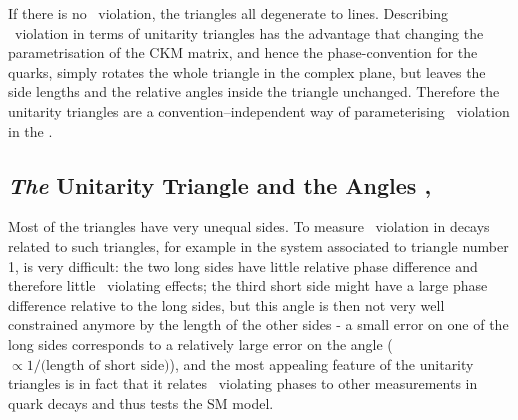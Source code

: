 If there is no \cp\ violation, the triangles all degenerate to
 lines. Describing \cp\ violation in terms of unitarity triangles has
 the advantage that changing the parametrisation of the CKM matrix,
 and hence the phase-convention for the quarks, simply rotates the
 whole triangle in the complex plane, but leaves the side lengths and
 the relative angles inside the triangle unchanged. Therefore the
 unitarity triangles are a convention--independent way of parameterising
 \cp\ violation in the \sm.


\subsection{\emph{The} Unitarity Triangle and the Angles \gam, \bet}
\label{sec:th.b.thetriangle}
 Most of the triangles have very unequal sides. To measure \cp\
 violation in decays related to such triangles, for example in the
 \prt{K^0} system associated to triangle number 1, is very difficult:
 the two long sides have little relative phase difference and
 therefore little \cp\ violating effects; the third short side might have a
 large phase difference relative to the long sides, but this angle is
 then not very well constrained anymore by the length of the other
 sides - a small error on one of the long sides corresponds to a
 relatively large error on the angle ($\propto 1/\mbox{(length of
 short side)}$), and the most appealing feature of the unitarity
 triangles is in fact that it relates \cp\ violating phases to other
 measurements in quark decays and thus tests the SM model.


